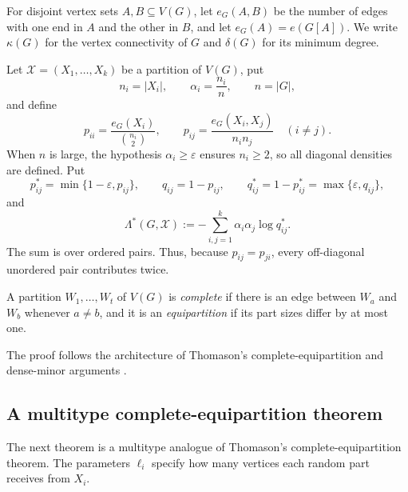 \documentclass{article}
\newtheorem{lem}[thm]{Lemma}
\newcommand{\eps}{\varepsilon}
\newcommand{\cX}{\mathcal X}
\begin{document}
For disjoint vertex sets $A,B\subseteq V(G)$, let $e_G(A,B)$ be the number of edges with one end in $A$ and the other in $B$, and let $e_G(A)=e(G[A])$.  We write $\kappa(G)$ for the vertex connectivity of $G$ and $\delta(G)$ for its minimum degree.

Let $\cX=(X_1,\dots,X_k)$ be a partition of $V(G)$, put
\[
 n_i=|X_i|,
 \qquad
 \alpha_i=\frac{n_i}{n},
 \qquad n=|G|,
\]
and define
\[
 p_{ii}=\frac{e_G(X_i)}{\binom{n_i}{2}},
 \qquad
 p_{ij}=\frac{e_G(X_i,X_j)}{n_i n_j}\quad(i\ne j).
\]
When $n$ is large, the hypothesis $\alpha_i\ge\eps$ ensures $n_i\ge2$, so all diagonal densities are defined.  Put
\[
 p_{ij}^*=\min\{1-\eps,p_{ij}\},
 \qquad
 q_{ij}=1-p_{ij},
 \qquad
 q_{ij}^*=1-p_{ij}^*=\max\{\eps,q_{ij}\},
\]
and
\begin{equation}\label{eq:Lambda-star-definition}
 \Lambda^*(G,\cX)
 :=-\sum_{i,j=1}^k \alpha_i\alpha_j\log q_{ij}^*.
\end{equation}
The sum is over ordered pairs.  Thus, because $p_{ij}=p_{ji}$, every off-diagonal unordered pair contributes twice.

A partition $W_1,\dots,W_t$ of $V(G)$ is \emph{complete} if there is an edge between $W_a$ and $W_b$ whenever $a\ne b$, and it is an \emph{equipartition} if its part sizes differ by at most one.

The proof follows the architecture of Thomason's complete-equipartition and dense-minor arguments \cite[Theorem 3.1, Corollary 3.1, and Theorem 4.1]{MR1814910}.

\subsection{A multitype complete-equipartition theorem}

The next theorem is a multitype analogue of Thomason's complete-equipartition theorem.  The parameters $\ell_i$ specify how many vertices each random part receives from $X_i$. 

\end{document}
